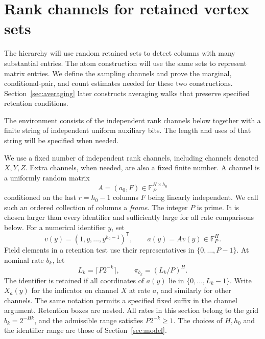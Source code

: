 \section{Rank channels for retained vertex sets}\label{sec:env}

The hierarchy will use random retained sets to detect columns with many
substantial entries.  The atom construction will use the same sets to
represent matrix entries.  We define the sampling channels and prove the
marginal, conditional-pair, and count estimates needed for these two
constructions.  Section~\ref{sec:averaging} later constructs averaging
walks that preserve specified retention conditions.

The environment consists of the independent rank channels below together
with a finite string of independent uniform auxiliary bits.  The length
and uses of that string will be specified when needed.

We use a fixed number of independent rank channels, including channels
denoted $X,Y,Z$. Extra channels, when needed, are also a fixed finite
number. A channel is a uniformly random matrix
\[
A=(a_0,F)\in\mathbb F_P^{H\times h_0}
\]
conditioned on the last $r=h_0-1$ columns $F$ being linearly
independent. We call such an ordered collection of columns a \emph{frame}.
The integer $P$ is prime. It is chosen larger than every
identifier and sufficiently large for all rate comparisons below.
For a numerical identifier $y$, set
\[
v(y)=(1,y,\ldots,y^{h_0-1})^{\mathsf T},
\qquad a(y)=Av(y)\in\mathbb F_P^H.
\]
Field elements in a retention test use their representatives in
$\{0,\ldots,P-1\}$. At nominal rate $b_k$, let
\[
L_k=\lceil P2^{-k}\rceil,\qquad
\pi_{b_k}=(L_k/P)^H.
\]
The identifier is retained if all coordinates of $a(y)$ lie in
$\{0,\ldots,L_k-1\}$. Write $X_a(y)$ for the indicator on channel
$X$ at rate $a$, and similarly for other channels.
The same notation permits a specified fixed suffix in the channel
argument. Retention boxes are nested.
All rates in this section belong to the grid $b_k=2^{-Hk}$, and the
admissible range satisfies $P2^{-k}\ge1$. The choices of $H,h_0$ and
the identifier range are those of Section~\ref{sec:model}.

